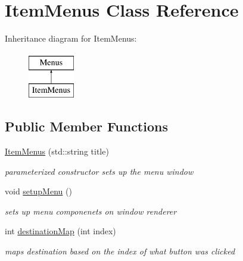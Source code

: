 \hypertarget{class_item_menus}{}\section{Item\+Menus Class Reference}
\label{class_item_menus}
Inheritance diagram for Item\+Menus\+:\begin{figure}[H]
\begin{center}
\leavevmode
\includegraphics[height=2.000000cm]{class_item_menus}
\end{center}
\end{figure}
\subsection*{Public Member Functions}
\begin{DoxyCompactItemize}
\item 
\hypertarget{class_item_menus_a4ecfa363e9c533c75a52da261dc9d683}{}\label{class_item_menus_a4ecfa363e9c533c75a52da261dc9d683} 
\hyperlink{class_item_menus_a4ecfa363e9c533c75a52da261dc9d683}{Item\+Menus} (std\+::string title)
\begin{DoxyCompactList}\small\item\em parameterized constructor sets up the menu window \end{DoxyCompactList}\item 
\hypertarget{class_item_menus_a58893999bb02708910ede5068bb46a6d}{}\label{class_item_menus_a58893999bb02708910ede5068bb46a6d} 
void \hyperlink{class_item_menus_a58893999bb02708910ede5068bb46a6d}{setup\+Menu} ()
\begin{DoxyCompactList}\small\item\em sets up menu componenets on window renderer \end{DoxyCompactList}\item 
\hypertarget{class_item_menus_aeb03662445f3fb375b6ae595c0f45219}{}\label{class_item_menus_aeb03662445f3fb375b6ae595c0f45219} 
int \hyperlink{class_item_menus_aeb03662445f3fb375b6ae595c0f45219}{destination\+Map} (int index)
\begin{DoxyCompactList}\small\item\em maps destination based on the index of what button was clicked \end{DoxyCompactList}\end{DoxyCompactItemize}
